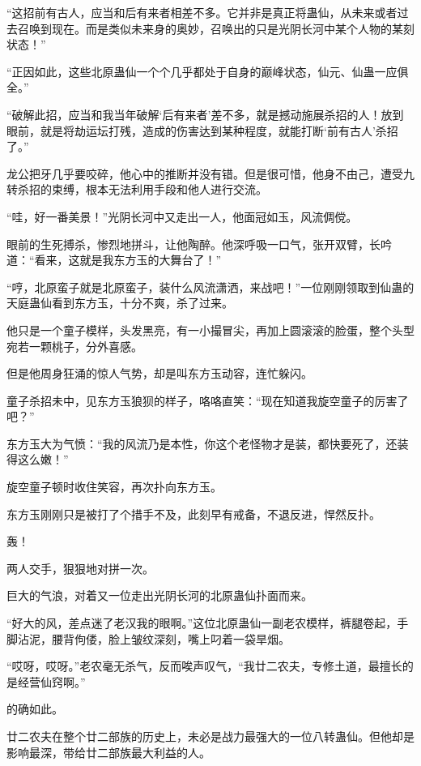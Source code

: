 
\begin{this_body}



“这招前有古人，应当和后有来者相差不多。它并非是真正将蛊仙，从未来或者过去召唤到现在。而是类似未来身的奥妙，召唤出的只是光阴长河中某个人物的某刻状态！”

“正因如此，这些北原蛊仙一个个几乎都处于自身的巅峰状态，仙元、仙蛊一应俱全。”

“破解此招，应当和我当年破解‘后有来者’差不多，就是撼动施展杀招的人！放到眼前，就是将劫运坛打残，造成的伤害达到某种程度，就能打断‘前有古人’杀招了。”

龙公把牙几乎要咬碎，他心中的推断并没有错。但是很可惜，他身不由己，遭受九转杀招的束缚，根本无法利用手段和他人进行交流。

“哇，好一番美景！”光阴长河中又走出一人，他面冠如玉，风流倜傥。

眼前的生死搏杀，惨烈地拼斗，让他陶醉。他深呼吸一口气，张开双臂，长吟道：“看来，这就是我东方玉的大舞台了！”

“哼，北原蛮子就是北原蛮子，装什么风流潇洒，来战吧！”一位刚刚领取到仙蛊的天庭蛊仙看到东方玉，十分不爽，杀了过来。

他只是一个童子模样，头发黑亮，有一小撮冒尖，再加上圆滚滚的脸蛋，整个头型宛若一颗桃子，分外喜感。

但是他周身狂涌的惊人气势，却是叫东方玉动容，连忙躲闪。

童子杀招未中，见东方玉狼狈的样子，咯咯直笑：“现在知道我旋空童子的厉害了吧？”

东方玉大为气愤：“我的风流乃是本性，你这个老怪物才是装，都快要死了，还装得这么嫩！”

旋空童子顿时收住笑容，再次扑向东方玉。

东方玉刚刚只是被打了个措手不及，此刻早有戒备，不退反进，悍然反扑。

轰！

两人交手，狠狠地对拼一次。

巨大的气浪，对着又一位走出光阴长河的北原蛊仙扑面而来。

“好大的风，差点迷了老汉我的眼啊。”这位北原蛊仙一副老农模样，裤腿卷起，手脚沾泥，腰背佝偻，脸上皱纹深刻，嘴上叼着一袋旱烟。

“哎呀，哎呀。”老农毫无杀气，反而唉声叹气，“我廿二农夫，专修土道，最擅长的是经营仙窍啊。”

的确如此。

廿二农夫在整个廿二部族的历史上，未必是战力最强大的一位八转蛊仙。但他却是影响最深，带给廿二部族最大利益的人。


\end{this_body}
